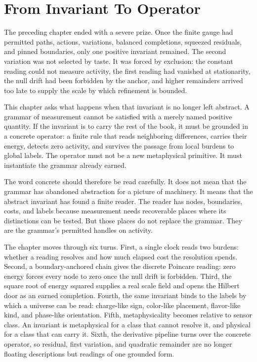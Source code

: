 \section{From Invariant To Operator}

The preceding chapter ended with a severe prize. Once the finite gauge had
permitted paths, actions, variations, balanced completions, squeezed
residuals, and pinned boundaries, only one positive invariant remained. The
second variation was not selected by taste. It was forced by exclusion: the
constant reading could not measure activity, the first reading had vanished
at stationarity, the null drift had been forbidden by the anchor, and higher
remainders arrived too late to supply the scale by which refinement is
bounded.

This chapter asks what happens when that invariant is no longer left
abstract. A grammar of measurement cannot be satisfied with a merely named
positive quantity. If the invariant is to carry the rest of the book, it must
be grounded in a concrete operator: a finite rule that reads neighboring
differences, carries their energy, detects zero activity, and survives the
passage from local burdens to global labels. The operator must not be a new
metaphysical primitive. It must instantiate the grammar already earned.

The word concrete should therefore be read carefully. It does not mean that
the grammar has abandoned abstraction for a picture of machinery. It means
that the abstract invariant has found a finite reader. The reader has nodes,
boundaries, costs, and labels because measurement needs recoverable places
where its distinctions can be tested. But those places do not replace the
grammar. They are the grammar's permitted handles on activity.

The chapter moves through six turns. First, a single clock reads two burdens:
whether a reading resolves and how much elapsed cost the resolution spends.
Second, a boundary-anchored chain gives the discrete Poincare reading: zero
energy forces every node to zero once the null drift is forbidden. Third,
the square root of energy squared supplies a real scale field and opens the
Hilbert door as an earned completion. Fourth, the same invariant binds to
the labels by which a universe can be read: charge-like sign, color-like
placement, flavor-like kind, and phase-like orientation. Fifth,
metaphysicality becomes relative to sensor class. An invariant is
metaphysical for a class that cannot resolve it, and physical for a class
that can carry it. Sixth, the derivative pipeline turns over the concrete
operator, so residual, first variation, and quadratic remainder are no
longer floating descriptions but readings of one grounded form.

